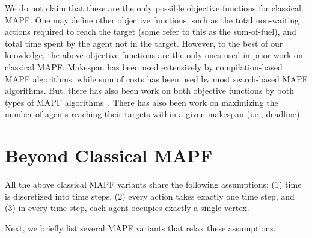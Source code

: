 \documentclass[letterpaper]{article} %
\newcommand{\comment}[1]{{\nb{\textbf{Comment:}}{orange}{#1}}}
\begin{document}
We do not claim that these are the only possible objective functions for classical MAPF. 
One may define other objective functions, such as the total non-waiting actions required to reach the target (some refer to this as the sum-of-fuel), and total time spent by the agent not in the target. 
However, to the best of our knowledge, the above objective functions are the only ones used in prior work on classical MAPF. Makespan has been used extensively by compilation-based MAPF algorithms, while sum of costs has been used by most search-based MAPF algorithms. But, there has also been work on both objective functions by both types of MAPF algorithms~\cite{surynek2016empirical}. There has also been work on maximizing the number of agents reaching their targets within a given makespan (i.e., deadline)~\cite{MaIJCAI18}.


\section{Beyond Classical MAPF}
All the above classical MAPF variants share the following assumptions: (1) time is discretized into time steps, (2) every action takes exactly one time step, 
and (3) in every time step, each agent occupies exactly a single vertex. 

Next, we briefly list several MAPF variants that relax these assumptions. 
\end{document}
